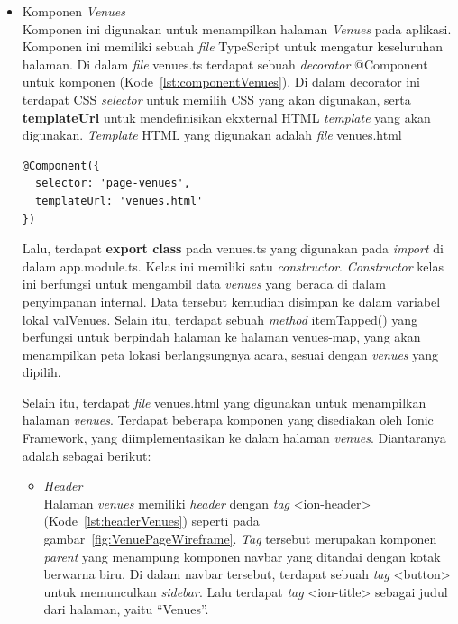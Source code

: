 \begin{itemize}
\begin{itemize}
	\end{itemize}

	\item Komponen \textit{Venues} \\
	Komponen ini digunakan untuk menampilkan halaman \textit{Venues} pada aplikasi. Komponen ini memiliki sebuah \textit{file} TypeScript untuk mengatur keseluruhan halaman. Di dalam \textit{file} venues.ts terdapat sebuah \textit{decorator} @Component untuk komponen (Kode~\ref{lst:componentVenues}). Di dalam decorator ini terdapat CSS \textit{selector} untuk memilih CSS yang akan digunakan, serta \textbf{templateUrl} untuk mendefinisikan ekxternal HTML \textit{template} yang akan digunakan. \textit{Template} HTML yang digunakan adalah \textit{file} venues.html
	
\begin{lstlisting}[language=html, label={lst:componentVenues}, caption=@Component pada venues.ts]
@Component({
  selector: 'page-venues',
  templateUrl: 'venues.html'
})
\end{lstlisting}

	Lalu, terdapat \textbf{export class} pada venues.ts yang digunakan pada \textit{import} di dalam app.module.ts. Kelas ini memiliki satu \textit{constructor}. \textit{Constructor} kelas ini berfungsi untuk mengambil data \textit{venues} yang berada di dalam penyimpanan internal. Data tersebut kemudian disimpan ke dalam variabel lokal valVenues. Selain itu, terdapat sebuah \textit{method} itemTapped() yang berfungsi untuk berpindah halaman ke halaman venues-map, yang akan menampilkan peta lokasi berlangsungnya acara, sesuai dengan \textit{venues} yang dipilih.

	Selain itu, terdapat \textit{file} venues.html yang digunakan untuk menampilkan halaman \textit{venues}. Terdapat beberapa komponen yang disediakan oleh Ionic Framework, yang diimplementasikan ke dalam halaman \textit{venues}. Diantaranya adalah sebagai berikut:	
	
	\begin{itemize}
		\item \textit{Header} \\
		Halaman \textit{venues} memiliki \textit{header} dengan \textit{tag} <ion-header> (Kode~\ref{lst:headerVenues}) seperti pada gambar~\ref{fig:VenuePageWireframe}. \textit{Tag} tersebut merupakan komponen \textit{parent} yang menampung komponen navbar yang ditandai dengan kotak berwarna biru. Di dalam navbar tersebut, terdapat sebuah \textit{tag} <button> untuk memunculkan \textit{sidebar}. Lalu terdapat \textit{tag} <ion-title> sebagai judul dari halaman, yaitu ``Venues''.
		

\end{itemize}
\end{itemize}
